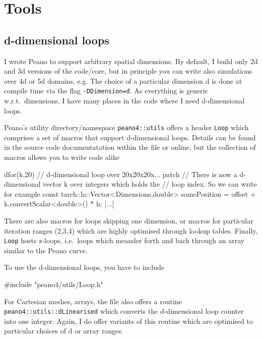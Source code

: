 \chapter{Tools}
\label{section:tools}


\section{d-dimensional loops}

I wrote Peano to support arbitrary spatial dimensions.
By default, I build only 2d and 3d versions of the code/core, but in principle
you can write also simulations over 4d or 5d domains, e.g.
The choice of a particular dimension d is done at compile time via the
flag \texttt{-DDimension=d}.
As everything is generic w.r.t.~dimensions, I have many places in the code where
I need d-dimensional loops.


Peano's utility directory/namespace \texttt{peano4::utils} offers a header
\texttt{Loop} which comprises a set of macros that support d-dimensional loops.
Details can be found in the source code documentatation within the file or
online, but the collection of macros allows you to write code alike

\begin{code}
  dfor(k,20) { // d-dimensional loop over 20x20x20x... patch
    // There is now a d-dimensional vector k over integers which holds the 
    // loop index. So we can write for example
    const tarch::la::Vector<Dimensions,double> somePosition = 
      offset + k.convertScalar<double>() * h;
    [...]
  }
\end{code}

\noindent
There are also macros for loops skipping one dimension, or macros for particular
iteration ranges (2,3,4) which are highly optimised through lookup tables.
Finally, \texttt{Loop} hosts z-loops, i.e.~loops which meander forth and back
through an array similar to the Peano curve.


To use the d-dimensional loops, you have to include
\begin{code}
#include "peano4/utils/Loop.h" 
\end{code}


For Cartesian meshes, arrays, the file also offers a routine
\texttt{peano4::utils::dLinearised} which converts the d-dimensional loop
counter into one integer.
Again, I do offer variants of this routine which are optimised to particular
choices of d or array ranges.

